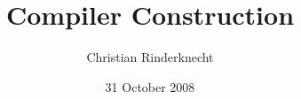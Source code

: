 \documentclass[compress,dvips,xcolor={dvipsnames},t]{beamer}
\title{Compiler Construction}
\author{Christian Rinderknecht}
\date{31 October 2008}
\begin{document}
\frame{\maketitle}











\end{document}
